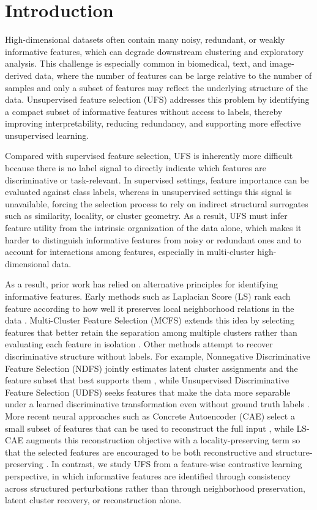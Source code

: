 \documentclass[sigconf,natbib=true,anonymous=true]{acmart}
\begin{document}
\section{Introduction}
High-dimensional datasets often contain many noisy, redundant, or weakly
informative features, which can degrade downstream clustering and exploratory
analysis. This challenge is especially common in biomedical, text, and
image-derived data, where the number of features can be large relative to the
number of samples and only a subset of features may reflect the underlying
structure of the data. Unsupervised feature selection (UFS) addresses this
problem by identifying a compact subset of informative features without access
to labels, thereby improving interpretability, reducing redundancy, and
supporting more effective unsupervised learning.

Compared with supervised feature selection, UFS is inherently more difficult
because there is no label signal to directly indicate which features are
discriminative or task-relevant. In supervised settings, feature importance can
be evaluated against class labels, whereas in unsupervised settings this signal
is unavailable, forcing the selection process to rely on indirect structural
surrogates such as similarity, locality, or cluster geometry. As a result, UFS
must infer feature utility from the intrinsic organization of the data alone,
which makes it harder to distinguish informative features from noisy or
redundant ones and to account for interactions among features, especially in
multi-cluster high-dimensional data.

As a result, prior work has relied on alternative principles for identifying
informative features. Early methods such as Laplacian Score (LS) rank each
feature according to how well it preserves local neighborhood relations in the
data \cite{he2005laplacian}. Multi-Cluster Feature Selection (MCFS) extends
this idea by selecting features that better retain the separation among
multiple clusters rather than evaluating each feature in isolation
\cite{cai2010unsupervised}. Other methods attempt to recover discriminative
structure without labels. For example, Nonnegative Discriminative Feature
Selection (NDFS) jointly estimates latent cluster assignments and the feature
subset that best supports them \cite{li2012unsupervised}, while Unsupervised
Discriminative Feature Selection (UDFS) seeks features that make the data more
separable under a learned discriminative transformation even without ground
truth labels \cite{yang2011udfs}. More recent neural approaches such as
Concrete Autoencoder (CAE) select a small subset of features that can be used
to reconstruct the full input \cite{balin2019concrete}, while LS-CAE augments
this reconstruction objective with a locality-preserving term so that the
selected features are encouraged to be both reconstructive and
structure-preserving \cite{shaham2022deep}. In contrast, we study UFS from a
feature-wise contrastive learning perspective, in which informative features are
identified through consistency across structured perturbations rather than
through neighborhood preservation, latent cluster recovery, or reconstruction
alone.
\end{document}
